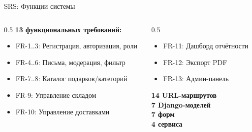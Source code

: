 \documentclass[aspectratio=169,14pt]{beamer}
\begin{document}
\begin{frame}{SRS: Функции системы}
\small
\begin{columns}
\begin{column}{0.5\textwidth}
\textbf{13 функциональных требований:}
\begin{itemize}
    \item FR-1..3: Регистрация, авторизация, роли
    \item FR-4..6: Письма, модерация, фильтр
    \item FR-7..8: Каталог подарков/категорий
    \item FR-9: Управление складом
    \item FR-10: Управление доставками
\end{itemize}
\end{column}
\begin{column}{0.5\textwidth}
\begin{itemize}
    \item FR-11: Дашборд отчётности
    \item FR-12: Экспорт PDF
    \item FR-13: Админ-панель
\end{itemize}
\vspace{0.3cm}
\textbf{14 URL-маршрутов}\\
\textbf{7 Django-моделей}\\
\textbf{7 форм}\\
\textbf{4 сервиса}
\end{column}
\end{columns}
\end{frame}
\end{document}
